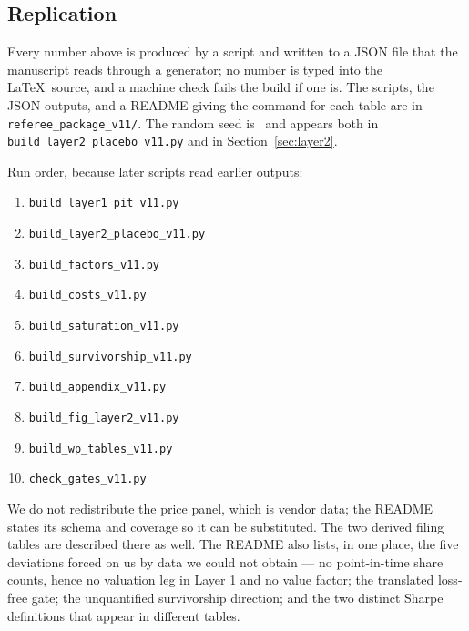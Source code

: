 \documentclass[a4paper,11pt]{article}
\begin{document}
\subsection*{Replication}

Every number above is produced by a script and written to a JSON file that the manuscript reads
through a generator; no number is typed into the \LaTeX\ source, and a machine check fails the build
if one is. The scripts, the JSON outputs, and a README giving the command for each table are in
\texttt{referee\_package\_v11/}. The random seed is \LtwoSeed\ and appears both in
\texttt{build\_layer2\_placebo\_v11.py} and in Section~\ref{sec:layer2}.

Run order, because later scripts read earlier outputs:

\begin{enumerate}\itemsep0pt\parskip0pt
\item \texttt{build\_layer1\_pit\_v11.py}
\item \texttt{build\_layer2\_placebo\_v11.py}
\item \texttt{build\_factors\_v11.py}
\item \texttt{build\_costs\_v11.py}
\item \texttt{build\_saturation\_v11.py}
\item \texttt{build\_survivorship\_v11.py}
\item \texttt{build\_appendix\_v11.py}
\item \texttt{build\_fig\_layer2\_v11.py}
\item \texttt{build\_wp\_tables\_v11.py}
\item \texttt{check\_gates\_v11.py}
\end{enumerate}

We do not redistribute the price panel, which is vendor data; the README states its schema and
coverage so it can be substituted. The two derived filing tables are described there as well. The
README also lists, in one place, the five deviations forced on us by data we could not obtain --- no
point-in-time share counts, hence no valuation leg in Layer 1 and no value factor; the translated
loss-free gate; the unquantified survivorship direction; and the two distinct Sharpe definitions
that appear in different tables.
\end{document}
